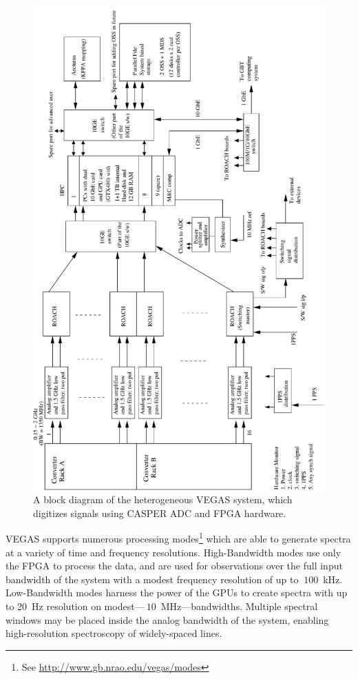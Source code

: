 \documentclass{ws-jai}
\begin{document}
\begin{figure}[htb]
 \centering
 \includegraphics[angle=270,origin=c, width=\textwidth]{./figures/vegas-block.pdf}
 \caption{A block diagram of the heterogeneous VEGAS system, which digitizes signals using CASPER ADC and FPGA hardware.}
 \label{fig:vegas}
\end{figure}


VEGAS supports numerous processing modes\footnote{See
\url{http://www.gb.nrao.edu/vegas/modes}} which are able to generate spectra at a variety of time and frequency resolutions. High-Bandwidth modes use only the FPGA to process the data, and are used for observations over the full input bandwidth of the system with a modest frequency resolution of up to $~100$~kHz. Low-Bandwidth modes harness the power of the GPUs to create spectra with up to 20~Hz resolution
on modest---$~10$~MHz---bandwidths.  Multiple spectral windows may be placed
inside the analog bandwidth of the system, enabling high-resolution
spectroscopy of widely-spaced lines.
\end{document}

